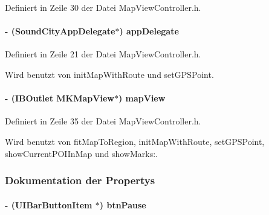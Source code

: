 Definiert in Zeile 30 der Datei MapViewController.h.\hypertarget{interface_map_view_controller_a12d413910165fe7fd177ea75502be782}{
\paragraph[{appDelegate}]{\setlength{\rightskip}{0pt plus 5cm}-\/ ({\bf SoundCityAppDelegate}$\ast$) {\bf appDelegate}}\hfill}
\label{interface_map_view_controller_a12d413910165fe7fd177ea75502be782}


Definiert in Zeile 21 der Datei MapViewController.h.

Wird benutzt von initMapWithRoute und setGPSPoint.\hypertarget{interface_map_view_controller_a5ae4cd29d4b84d9ed48341a58a2c0f4b}{
\paragraph[{mapView}]{\setlength{\rightskip}{0pt plus 5cm}-\/ (IBOutlet MKMapView$\ast$) {\bf mapView}}\hfill}
\label{interface_map_view_controller_a5ae4cd29d4b84d9ed48341a58a2c0f4b}


Definiert in Zeile 35 der Datei MapViewController.h.

Wird benutzt von fitMapToRegion, initMapWithRoute, setGPSPoint, showCurrentPOIInMap und showMarks:.

\subsubsection{Dokumentation der Propertys}
\hypertarget{interface_map_view_controller_add41cd6cc9df20dd9a3bb3663913395a}{
\paragraph[{btnPause}]{\setlength{\rightskip}{0pt plus 5cm}-\/ (UIBarButtonItem $\ast$) btnPause}\hfill}
\label{interface_map_view_controller_add41cd6cc9df20dd9a3bb3663913395a}


